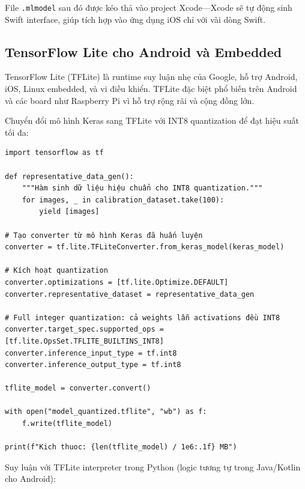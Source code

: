 File \texttt{.mlmodel} sau đó được kéo thả vào project Xcode---Xcode sẽ tự động sinh Swift interface, giúp tích hợp vào ứng dụng iOS chỉ với vài dòng Swift.

\subsection*{TensorFlow Lite cho Android và Embedded}

TensorFlow Lite (TFLite) là runtime suy luận nhẹ của Google, hỗ trợ Android, iOS, Linux embedded, và vi điều khiển. TFLite đặc biệt phổ biến trên Android và các board như Raspberry Pi vì hỗ trợ rộng rãi và cộng đồng lớn.

Chuyển đổi mô hình Keras sang TFLite với INT8 quantization để đạt hiệu suất tối đa:

\begin{verbatim}
import tensorflow as tf

def representative_data_gen():
    """Hàm sinh dữ liệu hiệu chuẩn cho INT8 quantization."""
    for images, _ in calibration_dataset.take(100):
        yield [images]

# Tạo converter từ mô hình Keras đã huấn luyện
converter = tf.lite.TFLiteConverter.from_keras_model(keras_model)

# Kích hoạt quantization
converter.optimizations = [tf.lite.Optimize.DEFAULT]
converter.representative_dataset = representative_data_gen

# Full integer quantization: cả weights lẫn activations đều INT8
converter.target_spec.supported_ops = [tf.lite.OpsSet.TFLITE_BUILTINS_INT8]
converter.inference_input_type = tf.int8
converter.inference_output_type = tf.int8

tflite_model = converter.convert()

with open("model_quantized.tflite", "wb") as f:
    f.write(tflite_model)

print(f"Kich thuoc: {len(tflite_model) / 1e6:.1f} MB")
\end{verbatim}

Suy luận với TFLite interpreter trong Python (logic tương tự trong Java/Kotlin cho Android):

